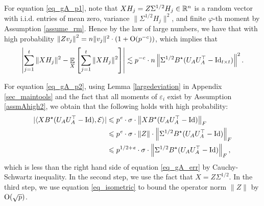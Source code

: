 	For equation \eqref{eq_gA_p1}, %
	note that $X H_j = Z \Sigma^{1/2} H_j \in \mathbb{R}^n$ is a random vector with i.i.d. entries of mean zero, variance $\|\Sigma^{1/2}H_j\|^2$, and finite $\varphi$-th moment by Assumption \eqref{assume_rm}.
	Hence by the law of large numbers, we have that with high probability
	${\left\|Z v_j \right\|^2 } = { n \|v_j\|^2} \cdot (1 + \operatorname{O}(p^{-c}))$,
	which implies that
	\begin{align}
		\left\lvert\sum_{j=1}^t \|X H_j\|^2 - \mathop{\mathbb{E}}_{X}\left[ \sum_{j=1}^t \|X H_j\|^2 \right]\right\rvert \lesssim p^{-c} \cdot n \left\| \Sigma^{1/2} B^{\star} (U_{A}U_A^{\top} - \operatorname{Id}_{t\times t}) \right\|^2. \label{eq_gA_err1}
	\end{align}

	For equation \eqref{eq_gA_p2}, using Lemma \ref{largedeviation} in Appendix \ref{sec_maintools} and the fact that all moments of $\varepsilon_i$ exist by Assumption \eqref{assmAhigh2}, we obtain that the following holds with high probability:
	\begin{align}
		|\langle XB^{\star} (U_AU_A^{\top} - \operatorname{Id}), \mathcal{E} \rangle| &\leqslant p^{\mathit{e}} \cdot \sigma \cdot \left\| XB^{\star} (U_AU_A^{\top} - \operatorname{Id}) \right\|_{F} \nonumber \\
		&\leqslant p^{{\mathit{e}}} \cdot \sigma \cdot \|Z\| \cdot \left\| \Sigma^{1/2} B^{\star}(U_AU_A^{\top} -\operatorname{Id}) \right\|_{F} \nonumber \\
		&\leqslant p^{1/2 + {\mathit{e}}} \cdot \sigma \cdot \left\| \Sigma^{1/2} B^{\star}(U_AU_A^{\top} -\operatorname{Id}) \right\|_{F}, \label{eq_gA_err2}
	\end{align}
	which is less than the right hand side of equation \eqref{eq_gA_err} by Cauchy-Schwartz inequality.
	In the second step, we use the fact that $X=Z\Sigma^{1/2}$.
	In the third step, we use equation \eqref{eq_isometric} to bound the operator norm $\|Z\|$ by $\operatorname{O}(\sqrt{p})$.

